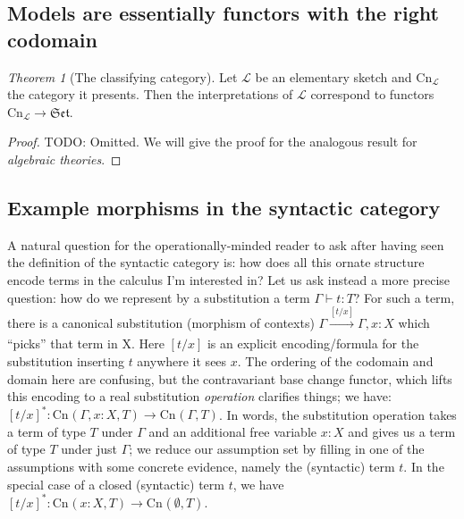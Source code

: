 \documentclass[12pt,twoside]{reedthesis}
\theoremstyle{definition}
\theoremstyle{remark}
\theoremstyle{theorem}
\newtheorem{theorem}{Theorem}
\begin{document}
\subsection{Models are essentially functors with the right codomain}
\newcommand{\clone}[3]{{\text{Cn}_{#1}(#2,#3)}}
\newcommand{\cn}{\mathrm{Cn}}
\begin{theorem}[The classifying category]\label{thm:classify_elem_sketch}
  Let $\mathcal{L}$ be an elementary sketch and \( \cn_{\mathcal{L}} \) the
  category it presents. Then the interpretations of $\mathcal{L}$ correspond to
  functors $\cn_{\mathcal{L}} \rightarrow \mathfrak{Set}$.
\end{theorem}
\begin{proof}
  TODO: Omitted. We will give the proof for the analogous result for \emph{algebraic theories}.
\end{proof}


\subsection{Example morphisms in the syntactic category}
A natural question for the operationally-minded reader to ask after having seen
the definition of the syntactic category is: how does all this ornate structure
encode terms in the calculus I'm interested in? Let us ask instead a more
precise question: how do we represent by a substitution a term \(\Gamma \vdash t : T\)?
For such a term, there is a canonical substitution (morphism of contexts)
\( \Gamma \xrightarrow[]{[t/x]} \Gamma,x:X \) which ``picks'' that term in X. Here $[t/x]$
is an explicit encoding/formula for the substitution inserting $t$ anywhere it
sees $x$. The ordering of the codomain and domain here are confusing, but the
contravariant base change functor, which lifts this encoding to a real
substitution \emph{operation} clarifies things; we have:
\( [t/x]^{*} : \clone{}{\Gamma, x:X}{T} \longrightarrow \clone{}{\Gamma}{T} \). In words, the
substitution operation takes a term of type $T$ under $\Gamma$ and an additional free
variable $x:X$ and gives us a term of type $T$ under just $\Gamma$; we reduce our
assumption set by filling in one of the assumptions with some concrete evidence,
namely the (syntactic) term $t$. In the special case of a closed (syntactic)
term $t$, we have \( [t/x]^{*} : \clone{}{x:X}{T} \longrightarrow \clone{}{\emptyset}{T}\).
\end{document}
